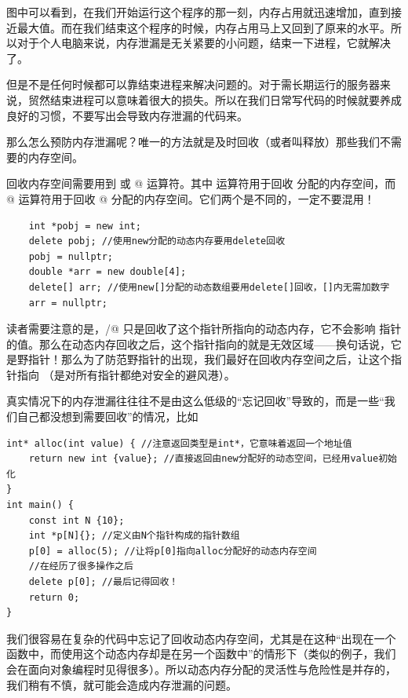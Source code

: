 图中可以看到，在我们开始运行这个程序的那一刻，内存占用就迅速增加，直到接近最大值。而在我们结束这个程序的时候，内存占用马上又回到了原来的水平。所以对于个人电脑来说，内存泄漏是无关紧要的小问题，结束一下进程，它就解决了。\par
但是不是任何时候都可以靠结束进程来解决问题的。对于需长期运行的服务器来说，贸然结束进程可以意味着很大的损失。所以在我们日常写代码的时候就要养成良好的习惯，不要写出会导致内存泄漏的代码来。\par
那么怎么预防内存泄漏呢？唯一的方法就是及时回收（或者叫释放）那些我们不需要的内存空间。\par
回收内存空间需要用到 \lstinline@delete@ 或 \lstinline@delete[]@ 运算符。其中  \lstinline@delete@ 运算符用于回收 \lstinline@new@ 分配的内存空间，而 \lstinline@delete[]@ 运算符用于回收 \lstinline@new[]@ 分配的内存空间。它们两个是不同的，一定不要混用！\par\pagebreak
\begin{lstlisting}
    int *pobj = new int;
    delete pobj; //使用new分配的动态内存要用delete回收
    pobj = nullptr;
    double *arr = new double[4];
    delete[] arr; //使用new[]分配的动态数组要用delete[]回收，[]内无需加数字
    arr = nullptr;
\end{lstlisting}
读者需要注意的是，\lstinline@delete@/\lstinline@delete[]@ 只是回收了这个指针所指向的动态内存，它不会影响 指针的值。那么在动态内存回收之后，这个指针指向的就是无效区域——换句话说，它是野指针！那么为了防范野指针的出现，我们最好在回收内存空间之后，让这个指针指向 \lstinline@nullptr@（\lstinline@nullptr@ 是对所有指针都绝对安全的避风港）。\par
真实情况下的内存泄漏往往往不是由这么低级的``忘记回收''导致的，而是一些``我们自己都没想到需要回收''的情况，比如
\begin{lstlisting}
int* alloc(int value) { //注意返回类型是int*，它意味着返回一个地址值
    return new int {value}; //直接返回由new分配好的动态空间，已经用value初始化
}
int main() {
    const int N {10};
    int *p[N]{}; //定义由N个指针构成的指针数组
    p[0] = alloc(5); //让将p[0]指向alloc分配好的动态内存空间
    //在经历了很多操作之后
    delete p[0]; //最后记得回收！
    return 0;
}
\end{lstlisting}
我们很容易在复杂的代码中忘记了回收动态内存空间，尤其是在这种``\lstinline@new@ 出现在一个函数中，而使用这个动态内存却是在另一个函数中''的情形下（类似的例子，我们会在面向对象编程时见得很多）。所以动态内存分配的灵活性与危险性是并存的，我们稍有不慎，就可能会造成内存泄漏的问题。\par
